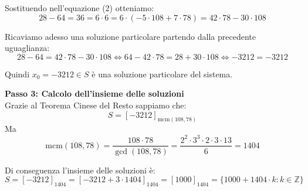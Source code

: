 \documentclass[12pt]{article}
\begin{document}
Sostituendo nell'equazione (2) otteniamo:
$$28 - 64 = 36 = 6 \cdot 6 = 6 \cdot (-5 \cdot 108 + 7 \cdot 78) = 42 \cdot 78 - 30 \cdot 108$$

Ricaviamo adesso una soluzione particolare partendo dalla precedente uguaglianza:
$$28 - 64 = 42 \cdot 78 - 30 \cdot 108 \iff 64 - 42 \cdot 78 = 28 + 30 \cdot 108 \iff -3212 = -3212$$

Quindi $x_0 = -3212 \in S$ è una soluzione particolare del sistema.


\textbf{Passo 3: Calcolo dell'insieme delle soluzioni} \\ 
Grazie al Teorema Cinese del Resto sappiamo che:
$$S = [-3212]_{\mathrm{mcm}(108, 78)}$$
Ma
$$\mathrm{mcm}({108}, {78}) = \frac{{108} \cdot {78}}{\gcd({108},{78})} = \frac{{2^{2} \cdot 3^{3}} \cdot {2 \cdot 3 \cdot 13}}{6} = {1404}$$

Di conseguenza l'insieme delle soluzioni è:
        $$S = [-3212]_{1404} = [-3212 + 3 \cdot 1404]_{1404} = [1000]_{1404} = \{1000 + 1404 \cdot k : k \in \mathbb{Z}\}$$
        
\end{document}
